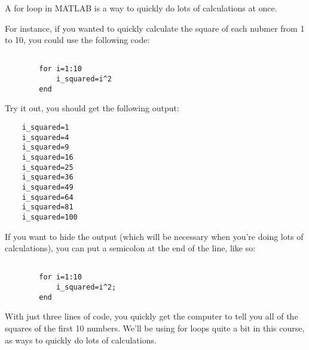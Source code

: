 \documentclass{ximera}
\begin{document}
  
  \begin{hint}
      
      A for loop in MATLAB is a way to quickly do lots of calculations at once.

  For instance, if you wanted to quickly calculate the square of each nubmer from 1 to 10, you could use the following code:
  \begin{verbatim}

        for i=1:10
            i_squared=i^2
        end

  \end{verbatim}

  Try it out, you should get the following output:

  \begin{verbatim}
    i_squared=1
    i_squared=4
    i_squared=9
    i_squared=16
    i_squared=25
    i_squared=36
    i_squared=49
    i_squared=64
    i_squared=81
    i_squared=100
  \end{verbatim}

  If you want to hide the output (which will be necessary when you're doing lots of calculations), you can put a semicolon at the end of the line, like so:

  \begin{verbatim}

        for i=1:10
            i_squared=i^2;
        end
  \end{verbatim}

  With just three lines of code, you quickly get the computer to tell you all of the squares of the first 10 numbers. We'll be using for loops quite a bit in this course, as ways to quickly do lots of calculations. 
  \end{hint}
\end{document}

